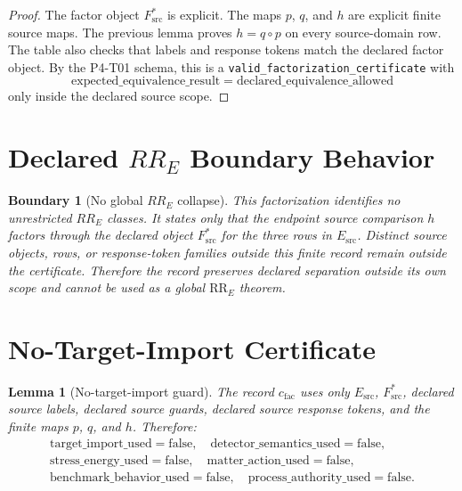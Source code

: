 \documentclass[11pt]{article}
\newcommand{\Esrc}{E_{\mathrm{src}}}
\newcommand{\Fsrc}{F_{\mathrm{src}}}
\newcommand{\RRE}{\mathrm{RR}_{E}}
\newtheorem{lemma}{Lemma}
\newtheorem{boundary}{Boundary}
\begin{document}
\begin{proof}
The factor object \(\Fsrc^{\ast}\) is explicit. The maps \(p\), \(q\), and
\(h\) are explicit finite source maps. The previous lemma proves \(h=q\circ p\)
on every source-domain row. The table also checks that labels and response
tokens match the declared factor object. By the P4-T01 schema, this is a
\texttt{valid\_factorization\_certificate} with
\[
  \mathrm{expected\_equivalence\_result}
  =\mathrm{declared\_equivalence\_allowed}
\]
only inside the declared source scope.
\end{proof}

\section{Declared \(RR_E\) Boundary Behavior}

\begin{boundary}[No global \(RR_E\) collapse]
This factorization identifies no unrestricted \(RR_E\) classes. It states only
that the endpoint source comparison \(h\) factors through the declared object
\(\Fsrc^{\ast}\) for the three rows in \(\Esrc\). Distinct source objects,
rows, or response-token families outside this finite record remain outside
the certificate. Therefore the record preserves declared separation outside
its own scope and cannot be used as a global \(\RRE\) theorem.
\end{boundary}

\section{No-Target-Import Certificate}

\begin{lemma}[No-target-import guard]
The record \(c_{\mathrm{fac}}\) uses only \(\Esrc\), \(\Fsrc^{\ast}\),
declared source labels, declared source guards, declared source response
tokens, and the finite maps \(p\), \(q\), and \(h\). Therefore:
\[
\begin{gathered}
\mathrm{target\_import\_used}=\mathrm{false},\quad
\mathrm{detector\_semantics\_used}=\mathrm{false},\\
\mathrm{stress\_energy\_used}=\mathrm{false},\quad
\mathrm{matter\_action\_used}=\mathrm{false},\\
\mathrm{benchmark\_behavior\_used}=\mathrm{false},\quad
\mathrm{process\_authority\_used}=\mathrm{false}.
\end{gathered}
\]
\end{lemma}
\end{document}

